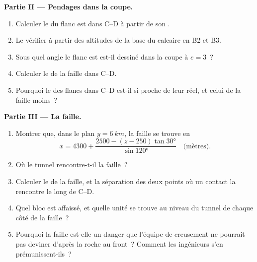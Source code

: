 \begin{problem}
\medskip
\noindent\textbf{Partie II --- Pendages dans la coupe.}
\begin{enumerate}[resume]
  \item Calculer le  du flanc est dans C--D à partir de son
        .
  \item Le vérifier à partir des altitudes de la base du calcaire en B2 et
        B3.
  \item Sous quel angle le flanc est est-il dessiné dans la coupe à $e = 3$~?
  \item Calculer le  de la faille dans C--D.
  \item Pourquoi le  des flancs dans C--D est-il si proche de
        leur  réel, et celui de la faille moins~?
\end{enumerate}

\medskip
\noindent\textbf{Partie III --- La faille.}
\begin{enumerate}[resume]
  \item Montrer que, dans le plan $y = \qty{6}{km}$, la faille se trouve en
        \[ x = 4300 + \frac{2500 - (z - 250)\tan\ang{30}}{\sin\ang{120}}
           \quad\text{(mètres)}. \]
  \item Où le tunnel rencontre-t-il la faille~?
  \item Calculer le  de la faille, et la séparation des deux
        points où un contact la rencontre le long de C--D.
  \item Quel bloc est affaissé, et quelle unité se trouve au niveau du tunnel de
        chaque côté de la faille~?
  \item Pourquoi la faille est-elle un danger que l'équipe de creusement ne
        pourrait pas deviner d'après la roche au front~? Comment les ingénieurs
        s'en prémunissent-ils~?
\end{enumerate}


\end{problem}
